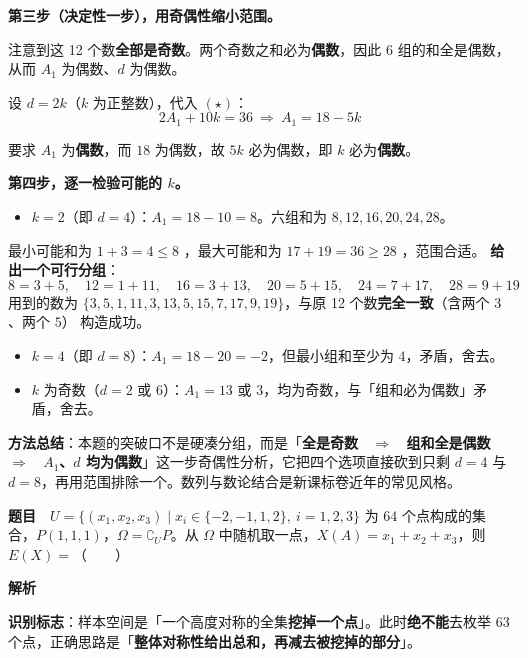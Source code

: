 \textbf{第三步（决定性一步），用奇偶性缩小范围。}

注意到这 12 个数\textbf{全部是奇数}。两个奇数之和必为\textbf{偶数}，因此 $6$ 组的和全是偶数，从而 $A_1$ 为偶数、$d$ 为偶数。

设 $d=2k$（$k$ 为正整数），代入 $(\star)$：
\[2A_1+10k=36\ \Longrightarrow\ A_1=18-5k\]

要求 $A_1$ 为\textbf{偶数}，而 $18$ 为偶数，故 $5k$ 必为偶数，即 $k$ 必为\textbf{偶数}。

\textbf{第四步，逐一检验可能的 $k$。}

\begin{itemize}
\item $k=2$（即 $d=4$）：$A_1=18-10=8$。六组和为 $8,12,16,20,24,28$。
\end{itemize}
  最小可能和为 $1+3=4\le 8$ ，最大可能和为 $17+19=36\ge 28$ ，范围合适。
  \textbf{给出一个可行分组}：
\[8=3+5,\quad 12=1+11,\quad 16=3+13,\quad 20=5+15,\quad 24=7+17,\quad 28=9+19\]
  用到的数为 $\{3,5,1,11,3,13,5,15,7,17,9,19\}$，与原 12 个数\textbf{完全一致}（含两个 $3$、两个 $5$） 构造成功。
\begin{itemize}
\item $k=4$（即 $d=8$）：$A_1=18-20=-2$，但最小组和至少为 $4$，矛盾，舍去。
\item $k$ 为奇数（$d=2$ 或 $6$）：$A_1=13$ 或 $3$，均为奇数，与「组和必为偶数」矛盾，舍去。
\end{itemize}


\begin{gktip}
\textbf{方法总结}：本题的突破口不是硬凑分组，而是「\textbf{全是奇数 ~$\Longrightarrow$~ 组和全是偶数 ~$\Longrightarrow$~ $A_1$、$d$ 均为偶数}」这一步奇偶性分析，它把四个选项直接砍到只剩 $d=4$ 与 $d=8$，再用范围排除一个。数列与数论结合是新课标卷近年的常见风格。
\end{gktip}

\par\medskip


\textbf{题目}　$U=\{(x_1,x_2,x_3)\mid x_i\in\{-2,-1,1,2\},\ i=1,2,3\}$ 为 $64$ 个点构成的集合，$P(1,1,1)$，$\Omega=\complement_U P$。从 $\Omega$ 中随机取一点，$X(A)=x_1+x_2+x_3$，则 $E(X)=$（　　）

\textbf{解析}

\textbf{识别标志}：样本空间是「一个高度对称的全集\textbf{挖掉一个点}」。此时\textbf{绝不能}去枚举 $63$ 个点，正确思路是「\textbf{整体对称性给出总和，再减去被挖掉的部分}」。

